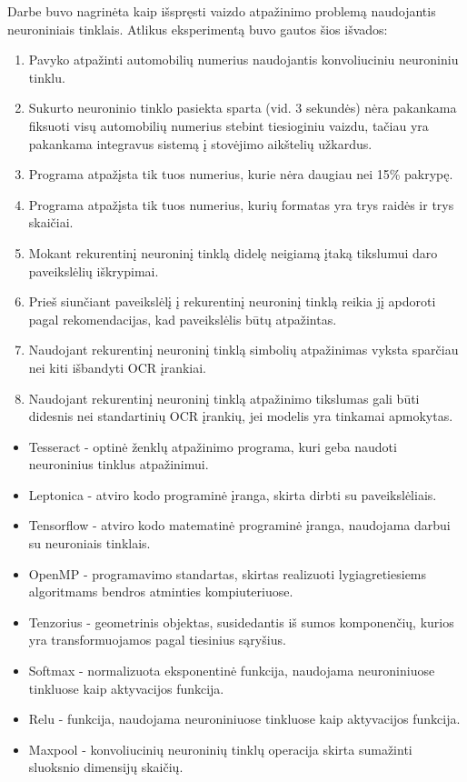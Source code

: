 \documentclass{VUMIFInfBakalaurinis}
\begin{document}
Darbe buvo nagrinėta kaip išspręsti vaizdo atpažinimo problemą naudojantis neuroniniais tinklais.
Atlikus eksperimentą buvo gautos šios išvados:
\begin{enumerate}[itemsep=0.5pt]
  \item Pavyko atpažinti automobilių numerius naudojantis konvoliuciniu neuroniniu tinklu.
  \item Sukurto neuroninio tinklo pasiekta sparta (vid. 3 sekundės) nėra pakankama fiksuoti visų automobilių numerius stebint tiesioginiu vaizdu, tačiau yra pakankama integravus sistemą į stovėjimo aikštelių užkardus.
  \item Programa atpažįsta tik tuos numerius, kurie nėra daugiau nei 15\% pakrypę.
  \item Programa atpažįsta tik tuos numerius, kurių formatas yra trys raidės ir trys skaičiai.
  \item Mokant rekurentinį neuroninį tinklą didelę neigiamą įtaką tikslumui daro paveikslėlių iškrypimai.
  \item Prieš siunčiant paveikslėlį į rekurentinį neuroninį tinklą reikia jį apdoroti pagal rekomendacijas, kad paveikslėlis būtų atpažintas.
  \item Naudojant rekurentinį neuroninį tinklą simbolių atpažinimas vyksta sparčiau nei kiti išbandyti OCR įrankiai.
  \item Naudojant rekurentinį neuroninį tinklą atpažinimo tikslumas gali būti didesnis nei standartinių OCR įrankių, jei modelis yra tinkamai apmokytas.
\end{enumerate}
\pagebreak
\printbibliography[heading=bibintoc]

\pagebreak
{}
\begin{itemize}[itemsep=0.5pt]
  \item Tesseract - optinė ženklų atpažinimo programa, kuri geba naudoti neuroninius tinklus atpažinimui.
  \item Leptonica - atviro kodo programinė įranga, skirta dirbti su paveikslėliais.
  \item Tensorflow - atviro kodo matematinė programinė įranga, naudojama darbui su neuroniais tinklais.
  \item OpenMP - programavimo standartas, skirtas realizuoti lygiagretiesiems algoritmams bendros atminties kompiuteriuose.
  \item Tenzorius - geometrinis objektas, susidedantis iš sumos komponenčių, kurios yra transformuojamos pagal tiesinius sąryšius.
  \item Softmax - normalizuota eksponentinė funkcija, naudojama neuroniniuose tinkluose kaip aktyvacijos funkcija.
  \item Relu - funkcija, naudojama neuroniniuose tinkluose kaip aktyvacijos funkcija.
  \item Maxpool - konvoliucinių neuroninių tinklų operacija skirta sumažinti sluoksnio dimensijų skaičių.
\end{itemize}
\end{document}
